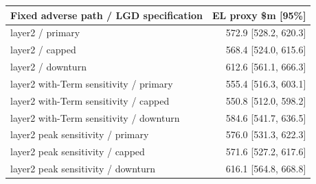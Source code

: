 \begingroup\small\setlength{\tabcolsep}{3pt}
\begin{tabularx}{\linewidth}{Xr}\toprule
Fixed adverse path / LGD specification & EL proxy \$m [95\%] \\ \midrule
layer2 / primary & 572.9 [528.2, 620.3] \\
layer2 / capped & 568.4 [524.0, 615.6] \\
layer2 / downturn & 612.6 [561.1, 666.3] \\
layer2 with-Term sensitivity / primary & 555.4 [516.3, 603.1] \\
layer2 with-Term sensitivity / capped & 550.8 [512.0, 598.2] \\
layer2 with-Term sensitivity / downturn & 584.6 [541.7, 636.5] \\
layer2 peak sensitivity / primary & 576.0 [531.3, 622.3] \\
layer2 peak sensitivity / capped & 571.6 [527.2, 617.6] \\
layer2 peak sensitivity / downturn & 616.1 [564.8, 668.8] \\
\bottomrule\end{tabularx}\endgroup
